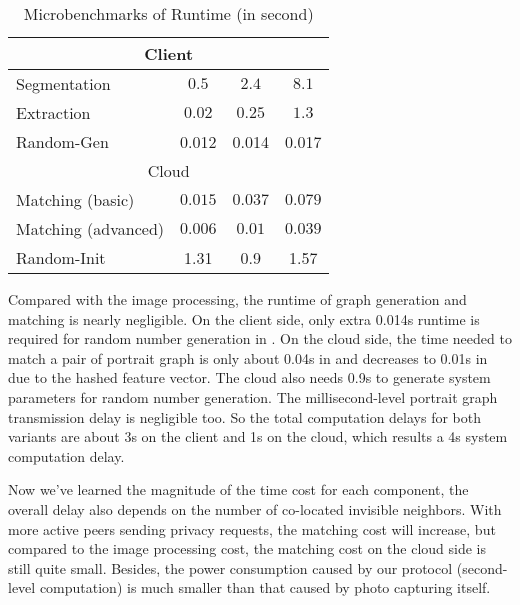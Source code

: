 \begin{table}[hp]
\vspace{-0.08in}
\caption{Microbenchmarks of Runtime (in second)}
\label{table:time}
\centering
{\footnotesize
\begin{tabular}{|l|c|c|c|}
\hline
\multicolumn{4}{|c|}{Client}\\
\hline
Segmentation & $0.5$ & $2.4$ & $8.1$\\
\hline
Extraction & $0.02$ & $0.25$ & $1.3$\\
\hline
Random-Gen & 0.012 & 0.014 & 0.017 \\
\hline
\multicolumn{4}{|c|}{Cloud}\\
\hline
Matching (basic) & $0.015$ & $0.037$ & $ 0.079$\\
\hline
Matching (advanced) & $0.006$ & $0.01$ & $ 0.039$\\
\hline
Random-Init &  1.31 & 0.9 & 1.57 \\
\hline
\end{tabular}}
\vspace{-0.1in}
\end{table}

Compared with the image processing, the runtime of graph generation and matching is nearly negligible.
On the client side, only extra 0.014s runtime is required for random number generation in
 \advanced. On the cloud side, the time needed to match a pair of portrait graph
 is only about 0.04s in \basic and decreases to 0.01s in \advanced due to the hashed feature vector.
The cloud also needs 0.9s to generate system parameters for random number generation.
The millisecond-level portrait graph transmission delay is negligible too.
So the total computation delays for both variants are about 3s on the client
 and 1s on the cloud, which results a 4s system computation delay.


Now we've learned the magnitude of the time cost for each component,
 the overall delay also depends on the number of co-located invisible neighbors.
With more active peers sending privacy requests, the matching cost will increase,
 but compared to the image processing cost, the matching cost on the cloud side is still quite small.
Besides, the power consumption caused by our protocol (second-level computation) is much smaller than that caused by photo capturing itself.






















